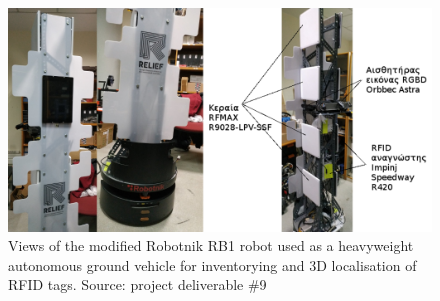 \vfill

\begin{figure}[H]\centering
  \includegraphics[scale=0.4]{images/relief/rb1/rb1_1x4.png}
  \caption{\small Views of the modified Robotnik RB1 robot used as a heavyweight
           autonomous ground vehicle for inventorying and 3D localisation of
           RFID tags. Source: project deliverable \#9}
  \label{fig:relief_rb1_1x4}
\end{figure}

